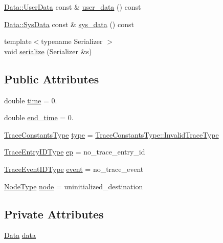 \begin{DoxyCompactItemize}
\item 
\hyperlink{structvt_1_1trace_1_1_log_1_1_data_1_1_user_data}{Data\+::\+User\+Data} const  \& \hyperlink{structvt_1_1trace_1_1_log_a7b251bc7dcebcbbafa29cc2ca6ea4c12}{user\+\_\+data} () const
\item 
\hyperlink{structvt_1_1trace_1_1_log_1_1_data_1_1_sys_data}{Data\+::\+Sys\+Data} const  \& \hyperlink{structvt_1_1trace_1_1_log_a082937c397ac5b47ffc9089ff94698f0}{sys\+\_\+data} () const
\item 
{\footnotesize template$<$typename Serializer $>$ }\\void \hyperlink{structvt_1_1trace_1_1_log_ac2fb17b80708e2adf690e3b68d225c25}{serialize} (Serializer \&s)
\end{DoxyCompactItemize}
\subsection*{Public Attributes}
\begin{DoxyCompactItemize}
\item 
double \hyperlink{structvt_1_1trace_1_1_log_a91a7891f5f287385c1323053e3c675c0}{time} = 0.
\item 
double \hyperlink{structvt_1_1trace_1_1_log_a86325bb2e6116b587f168bc2f1701f3a}{end\+\_\+time} = 0.
\item 
\hyperlink{namespacevt_1_1trace_acf454dfbd581b0ebae895f90b5927a1d}{Trace\+Constants\+Type} \hyperlink{structvt_1_1trace_1_1_log_a6415eacd3721d71029ff6edb909fc63d}{type} = \hyperlink{namespacevt_1_1trace_acf454dfbd581b0ebae895f90b5927a1da319f6b5fbfb85275879d449149167c7e}{Trace\+Constants\+Type\+::\+Invalid\+Trace\+Type}
\item 
\hyperlink{namespacevt_1_1trace_a3c14050715ba9eceaeff51fb3de64f2f}{Trace\+Entry\+I\+D\+Type} \hyperlink{structvt_1_1trace_1_1_log_aaeb605b768747d37e7b4bb062f14bb32}{ep} = no\+\_\+trace\+\_\+entry\+\_\+id
\item 
\hyperlink{namespacevt_1_1trace_a64a7185f3e102df8d8258f263ccd1582}{Trace\+Event\+I\+D\+Type} \hyperlink{structvt_1_1trace_1_1_log_a88aa88893277f0feb9776e96048a9294}{event} = no\+\_\+trace\+\_\+event
\item 
\hyperlink{namespacevt_a866da9d0efc19c0a1ce79e9e492f47e2}{Node\+Type} \hyperlink{structvt_1_1trace_1_1_log_a39a932cb9c4775f83117d0be477bc8c8}{node} = uninitialized\+\_\+destination
\end{DoxyCompactItemize}
\subsection*{Private Attributes}
\begin{DoxyCompactItemize}
\item 
\hyperlink{unionvt_1_1trace_1_1_log_1_1_data}{Data} \hyperlink{structvt_1_1trace_1_1_log_ac79b001b6167a37e337bc9d704af8535}{data}
\end{DoxyCompactItemize}


